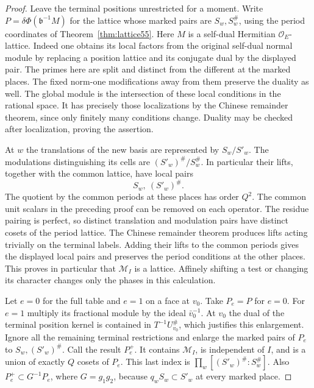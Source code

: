 \documentclass[a4paper,11pt]{article}
\theoremstyle{definition}
\theoremstyle{remark}
\numberwithin{equation}{section}
\begin{document}
\begin{proof}
Leave the terminal positions unrestricted for a moment. Write
\(P=\delta\Phi(\mathfrak b^{-1}M)\) for the lattice whose
marked pairs are \(S_w,S_w^\#\), using the period coordinates of
Theorem~\ref{thm:lattice55}. Here \(M\) is a self-dual Hermitian
\(\mathcal O_E\)-lattice. Indeed one obtains its local factors
from the original self-dual normal module by replacing a
position lattice and its conjugate dual by the displayed pair.
The primes here are split and distinct from the different
at the marked places. The fixed norm-one modifications away
from them preserve the duality as well. The global module is
the intersection of these local conditions in the rational
space. It has precisely those localizations by the Chinese
remainder theorem, since only finitely many conditions change.
Duality may be checked after localization, proving the assertion.

At \(w\) the translations of the new basis are represented by
\(S_w/S'_w\). The modulations distinguishing its cells are
\((S'_w)^\#/S_w^\#\). In particular their lifts, together with
the common lattice, have local pairs
\[
                  S_w,\ (S'_w)^\# .
\]
The quotient by the common periods at these places has order
\(Q^2\). The common unit scalars in the preceding proof can
be removed on each operator. The residue pairing is perfect,
so distinct translation and modulation pairs have distinct
cosets of the period lattice. The Chinese remainder theorem
produces lifts acting trivially on the terminal labels. Adding
their lifts to the common periods gives the displayed local
pairs and preserves the period conditions at the other places.
This proves in particular that \(\mathcal M_I\) is a lattice.
Affinely shifting a test or changing its character changes
only the phases in this calculation.

Let \(e=0\) for the full table and \(e=1\) on a face at \(v_0\).
Take \(P_e=P\) for \(e=0\). For \(e=1\) multiply its fractional
module by the ideal \(\bar v_0^{-1}\).
At \(v_0\) the dual of the terminal position kernel is contained
in \(T^{-1}U_{v_0}^\#\), which justifies this enlargement.
Ignore all the remaining terminal restrictions and enlarge
the marked pairs of \(P_e\) to \(S_w,(S'_w)^\#\). Call the
result \(P_e^+\). It contains \(\mathcal M_I\), is independent
of \(I\), and is a union of exactly \(Q\) cosets of \(P_e\).
This last index is \(\prod_w[(S'_w)^\#:S_w^\#]\).
Also \(P_e^+\subset G^{-1}P_e\), where \(G=g_1g_2\),
because \(q_w S_w\subset S'_w\) at every marked place.


\end{proof}
\end{document}
